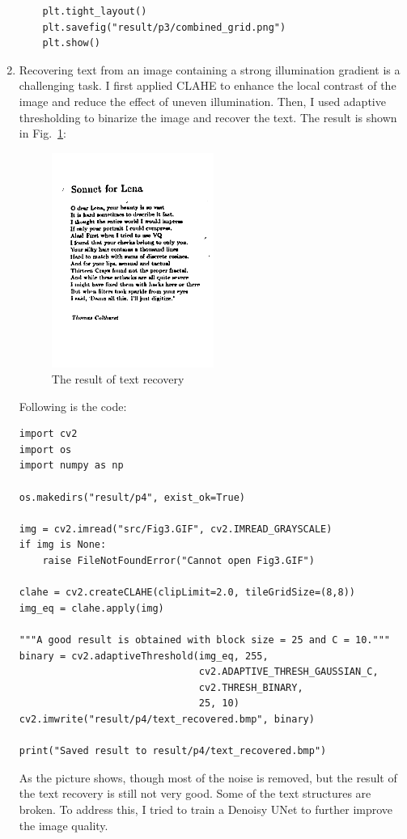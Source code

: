 \documentclass[12pt,a4paper]{article}
\begin{document}
\begin{enumerate}
\begin{verbatim}
    plt.tight_layout()
    plt.savefig("result/p3/combined_grid.png")
    plt.show()
    \end{verbatim}
    \item Recovering text from an image containing a strong illumination gradient is a challenging task. I first applied CLAHE to enhance the local contrast of the image and reduce the effect of uneven illumination. Then, I used adaptive thresholding to binarize the image and recover the text. The result is shown in Fig.~\ref{fig:p4}:
    \begin{figure}[H]
        \centering
        \includegraphics[width=0.5\textwidth]{src/img/p4/text_recovered.png}
        \caption{The result of text recovery}
        \label{fig:p4}
    \end{figure}
    Following is the code:
    \begin{verbatim}
import cv2
import os
import numpy as np

os.makedirs("result/p4", exist_ok=True)

img = cv2.imread("src/Fig3.GIF", cv2.IMREAD_GRAYSCALE)
if img is None:
    raise FileNotFoundError("Cannot open Fig3.GIF")

clahe = cv2.createCLAHE(clipLimit=2.0, tileGridSize=(8,8))
img_eq = clahe.apply(img)

"""A good result is obtained with block size = 25 and C = 10."""
binary = cv2.adaptiveThreshold(img_eq, 255,
                               cv2.ADAPTIVE_THRESH_GAUSSIAN_C,
                               cv2.THRESH_BINARY,
                               25, 10)
cv2.imwrite("result/p4/text_recovered.bmp", binary)

print("Saved result to result/p4/text_recovered.bmp")
    \end{verbatim}
    As the picture shows, though most of the noise is removed, but the result of the text recovery is still not very good. Some of the text structures are broken. To address this, I tried to train a Denoisy UNet to further improve the image quality.
    

\end{enumerate}
\end{document}
